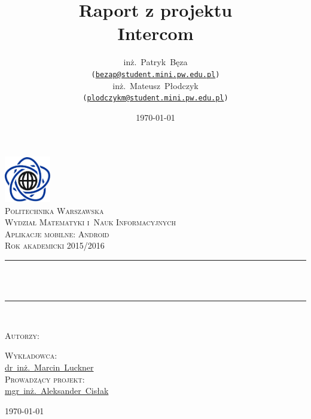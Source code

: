 \documentclass[a4paper,titlepage]{article}
\title{Raport z projektu\\[0.4em]Intercom}
\author{
    inż.~Patryk~Bęza\\\texttt{\small (\href{mailto:bezap@student.mini.pw.edu.pl}{bezap@student.mini.pw.edu.pl})}\\[0.7em]
    inż.~Mateusz~Płodczyk\\\texttt{\small (\href{mailto:plodczykm@student.mini.pw.edu.pl}{plodczykm@student.mini.pw.edu.pl})}\\[0.7em]
}
\date{\today}
\newcommand\blankpage{%
	\null
	\thispagestyle{empty}%
	\addtocounter{page}{-1}%
	\newpage}
\theoremstyle{break}
\begin{document}
\makeatletter
\renewcommand{\ALG@name}{Algorytm}
\begin{titlepage}
\newcommand{\HRule}{\rule{\linewidth}{0.5mm}}
\center

\includegraphics[width=2.0cm]{img/mini}\\[1.5cm]
\textsc{\LARGE Politechnika Warszawska}\\[0.3cm]
\textsc{\Large Wydział Matematyki i~Nauk Informacyjnych}\\[1.5cm]
\textsc{\large Aplikacje mobilne: Android}\\[0.2cm]
\textsc{\small Rok akademicki 2015/2016}\\[1.5cm]

\HRule \\[0.6cm]
{ \huge \bfseries \@title}\\[0.7cm]
\HRule \\[1.75cm]

\begin{minipage}[t]{0.4\textwidth}
\begin{flushleft}\large
\textsc{Autorzy:}\\[3mm]
\@author
\end{flushleft}
\end{minipage}
\begin{minipage}[t]{0.4\textwidth}
\begin{flushright}\large
\textsc{Wykładowca:}\\[3mm]
\href{mailto:M.Luckner@mini.pw.edu.pl}{dr~inż.~Marcin~Luckner}\\[1cm]
\textsc{Prowadzący projekt:}\\[3mm]
\href{mailto:A.Cislak@mini.pw.edu.pl}{mgr~inż.~Aleksander~Cisłak}\\[1cm]
\end{flushright}
\end{minipage}
\vfill
{\large \today}

\end{titlepage}

\blankpage
\tableofcontents
\thispagestyle{empty} %
\clearpage
\blankpage
\end{document}
